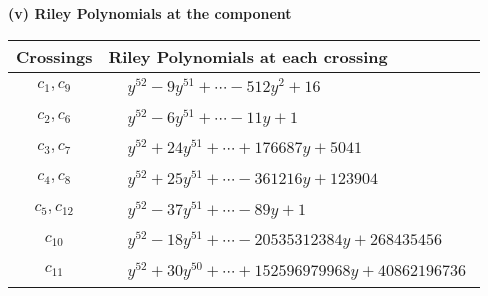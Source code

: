\documentclass[1p]{elsarticle_modified}
\theoremstyle{definition}
\begin{document}
\flushleft \textbf{(v) Riley Polynomials at the component}\newline \\
\begin{tabular}{m{50pt}|m{274pt}}
Crossings & \hspace{64pt}Riley Polynomials at each crossing \\
\hline $$\begin{aligned}c_{1},c_{9}\end{aligned}$$&$\begin{aligned}
&y^{52}-9 y^{51}+\cdots-512 y^2+16
\end{aligned}$\\
\hline $$\begin{aligned}c_{2},c_{6}\end{aligned}$$&$\begin{aligned}
&y^{52}-6 y^{51}+\cdots-11 y+1
\end{aligned}$\\
\hline $$\begin{aligned}c_{3},c_{7}\end{aligned}$$&$\begin{aligned}
&y^{52}+24 y^{51}+\cdots+176687 y+5041
\end{aligned}$\\
\hline $$\begin{aligned}c_{4},c_{8}\end{aligned}$$&$\begin{aligned}
&y^{52}+25 y^{51}+\cdots-361216 y+123904
\end{aligned}$\\
\hline $$\begin{aligned}c_{5},c_{12}\end{aligned}$$&$\begin{aligned}
&y^{52}-37 y^{51}+\cdots-89 y+1
\end{aligned}$\\
\hline $$\begin{aligned}c_{10}\end{aligned}$$&$\begin{aligned}
&y^{52}-18 y^{51}+\cdots-20535312384 y+268435456
\end{aligned}$\\
\hline $$\begin{aligned}c_{11}\end{aligned}$$&$\begin{aligned}
&y^{52}+30 y^{50}+\cdots+152596979968 y+40862196736
\end{aligned}$\\
\hline
\end{tabular}\\~\\
\end{document}
